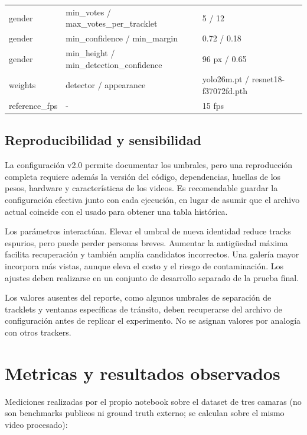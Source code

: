 \documentclass[12pt,letterpaper]{article}
\begin{document}
\begin{longtable}{P{0.28\textwidth}P{0.22\textwidth}P{0.42\textwidth}}
gender & min\_\allowbreak votes / max\_\allowbreak votes\_\allowbreak per\_\allowbreak tracklet & 5 / 12 \\

gender & min\_\allowbreak confidence / min\_\allowbreak margin & 0.72 / 0.18 \\

gender & min\_\allowbreak height / min\_\allowbreak detection\_\allowbreak confidence & 96 px / 0.65 \\

weights & detector / appearance & yolo26m.pt / resnet18-f37072fd.pth \\

reference\_\allowbreak fps & - & 15 fps \\

\bottomrule
\end{longtable}
\endgroup

\subsection{Reproducibilidad y sensibilidad}
La configuración v2.0 permite documentar los umbrales, pero una reproducción completa requiere además la versión del código, dependencias, huellas de los pesos, hardware y características de los videos. Es recomendable guardar la configuración efectiva junto con cada ejecución, en lugar de asumir que el archivo actual coincide con el usado para obtener una tabla histórica.

Los parámetros interactúan. Elevar el umbral de nueva identidad reduce tracks espurios, pero puede perder personas breves. Aumentar la antigüedad máxima facilita recuperación y también amplía candidatos incorrectos. Una galería mayor incorpora más vistas, aunque eleva el costo y el riesgo de contaminación. Los ajustes deben realizarse en un conjunto de desarrollo separado de la prueba final.

Los valores ausentes del reporte, como algunos umbrales de separación de tracklets y ventanas específicas de tránsito, deben recuperarse del archivo de configuración antes de replicar el experimento. No se asignan valores por analogía con otros trackers.

\section{Metricas y resultados observados}

Mediciones realizadas por el propio notebook sobre el dataset de tres camaras (no son benchmarks publicos ni ground truth externo; se calculan sobre el mismo video procesado):
\end{document}
